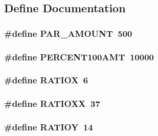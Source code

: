 \subsection{Define Documentation}
\hypertarget{WL__INTER_8C_a03af7e2635475ea9e7d82dbbdfb63d36}{
\subsubsection[{PAR\_\-AMOUNT}]{\setlength{\rightskip}{0pt plus 5cm}\#define PAR\_\-AMOUNT~500}}
\label{WL__INTER_8C_a03af7e2635475ea9e7d82dbbdfb63d36}
\hypertarget{WL__INTER_8C_a0dfa3c33be744c938e397f67877a27cb}{
\subsubsection[{PERCENT100AMT}]{\setlength{\rightskip}{0pt plus 5cm}\#define PERCENT100AMT~10000}}
\label{WL__INTER_8C_a0dfa3c33be744c938e397f67877a27cb}
\hypertarget{WL__INTER_8C_a2cf43e900bb281b39b5d58f59bbe45da}{
\subsubsection[{RATIOX}]{\setlength{\rightskip}{0pt plus 5cm}\#define RATIOX~6}}
\label{WL__INTER_8C_a2cf43e900bb281b39b5d58f59bbe45da}
\hypertarget{WL__INTER_8C_ad72246e57edaf2c7c8d190711c5f187b}{
\subsubsection[{RATIOXX}]{\setlength{\rightskip}{0pt plus 5cm}\#define RATIOXX~37}}
\label{WL__INTER_8C_ad72246e57edaf2c7c8d190711c5f187b}
\hypertarget{WL__INTER_8C_a1d637d5ac9cd9bae9d726959f61437c0}{
\subsubsection[{RATIOY}]{\setlength{\rightskip}{0pt plus 5cm}\#define RATIOY~14}}
\label{WL__INTER_8C_a1d637d5ac9cd9bae9d726959f61437c0}
